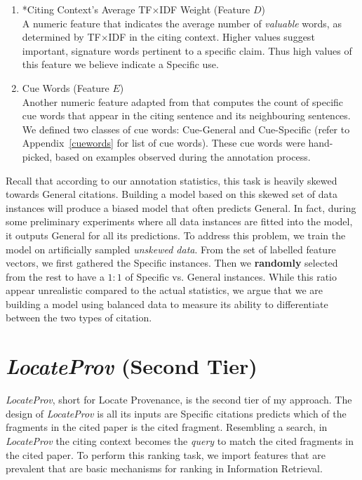 \begin{enumerate}
\item *Citing Context's Average TF$\times$IDF Weight (Feature $D$)\\
A numeric feature that indicates the average number of \textit{valuable} words, as determined by TF$\times$IDF \cite{irtextbook} in the citing context. Higher values suggest important, signature words pertinent to a specific claim.  Thus high values of this feature we believe indicate a Specific use.

\item Cue Words (Feature $E$)\\
Another numeric feature adapted from  that computes the count of specific cue words that appear in the citing sentence and its neighbouring sentences. We defined two classes of cue words: Cue-General and Cue-Specific (refer to Appendix~\ref{cuewords} for list of cue words). These cue words were hand-picked, based on examples observed during the annotation process.
\end{enumerate}

Recall that according to our annotation statistics, this task is heavily skewed towards General citations. Building a model based on this skewed set of data instances will produce a biased model that often predicts General. In fact, during some preliminary experiments where all data instances are fitted into the model, it outputs General for all its predictions. To address this problem, we train the model on artificially sampled {\it unskewed data}.  From the set of labelled feature vectors, we first gathered the Specific instances. Then we {\bf randomly} selected from the rest to have a $1:1$ of Specific vs. General instances. While this ratio appear unrealistic compared to the actual statistics, we argue that we are building a model using balanced data to measure its ability to differentiate between the two types of citation.

\section{{\it LocateProv} (Second Tier)}
\label{secondtier}
{\it LocateProv}, short for Locate Provenance, is the second tier of my approach. The design of {\it LocateProv} is all its inputs are Specific citations predicts which of the fragments in the cited paper is the cited fragment. Resembling a search, in {\it LocateProv} the citing context becomes the {\it query} to match the cited fragments in the cited paper. To perform this ranking task, we import features that are prevalent that are basic mechanisms for ranking in Information Retrieval.

